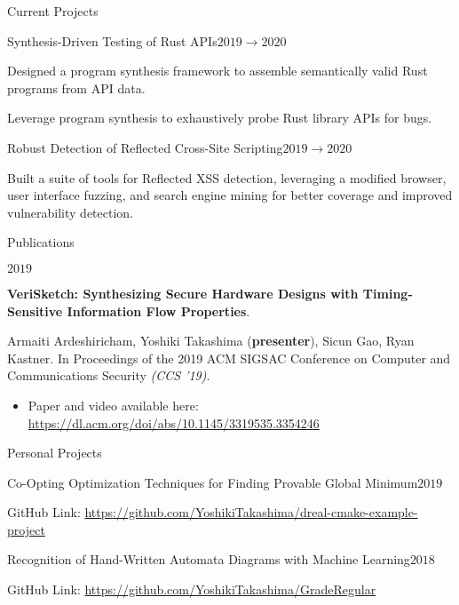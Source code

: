 \documentclass{resume} %
\begin{document}
\begin{rSection}{Current Projects}
\begin{rSubsection}{Synthesis-Driven Testing of Rust APIs}{$2019 \rightarrow 2020$}{}{}
    \item Designed a program synthesis framework to assemble semantically valid Rust programs from API data.
    \item Leverage program synthesis to exhaustively probe Rust library APIs for bugs.
\end{rSubsection}
\begin{rSubsection}{Robust Detection of Reflected Cross-Site Scripting}{$2019 \rightarrow 2020$}{}{}
    \item Built a suite of tools for Reflected XSS detection, leveraging a modified browser, user interface fuzzing, and search engine mining for better coverage and improved vulnerability detection.
\end{rSubsection}
\end{rSection}

\newpage
\begin{rSection}{Publications}
\begin{rSubsection}{}{$2019$}{}{}
    \item \textbf{VeriSketch: Synthesizing Secure Hardware Designs with Timing-Sensitive Information Flow Properties}. 
    
    Armaiti Ardeshiricham, Yoshiki Takashima (\textbf{presenter}), Sicun Gao, Ryan Kastner. In Proceedings of the 2019 ACM SIGSAC Conference on Computer and Communications Security \textit{(CCS '19)}.
    \begin{itemize}
        \item Paper and video available here: \href{https://dl.acm.org/doi/abs/10.1145/3319535.3354246}{https://dl.acm.org/doi/abs/10.1145/3319535.3354246}
    \end{itemize}
\end{rSubsection}
\end{rSection}

\begin{rSection}{Personal Projects}
\begin{rSubsection}{Co-Opting Optimization Techniques for Finding Provable Global Minimum}{$2019$}{}{}
    \item GitHub Link: \href{https://github.com/YoshikiTakashima/dreal-cmake-example-project}{https://github.com/YoshikiTakashima/dreal-cmake-example-project}
\end{rSubsection}
\begin{rSubsection}{Recognition of Hand-Written Automata Diagrams with Machine Learning}{$2018$}{}{}
    \item GitHub Link: \href{https://github.com/YoshikiTakashima/GradeRegular}{https://github.com/YoshikiTakashima/GradeRegular}

\end{rSubsection}
\end{rSection}
\end{document}
